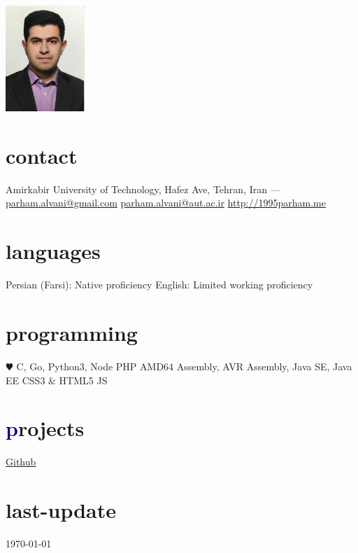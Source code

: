 \documentclass[]{friggeri-cv} %
\begin{document}


\begin{aside} %
	\includegraphics[width=3cm, height=4cm]{../parham_alvani_pers.jpg}
	\section{\textcolor{TextYellow}{c}ontact}
	Amirkabir University of Technology,
	Hafez Ave,
	Tehran, Iran
	---
	\href{mailto:parham.alvani@gmail.com}{parham.alvani@gmail.com}
	\href{mailto:parham.alvani@aut.ac.ir}{parham.alvani@aut.ac.ir}
	\href{http://1995parham.me/}{http://1995parham.me}
	\section{\textcolor{TextOrange}{l}anguages}
	Persian (Farsi):
	Native proficiency
	English:
	Limited working proficiency
	\section{\textcolor{TextGreen}{p}rogramming}
	{\color{red} $\varheartsuit$} C, Go, Python3, Node
	PHP
	AMD64 Assembly,
	AVR Assembly,
	Java SE, Java EE
	CSS3 \& HTML5
	JS
	\section{\textcolor{DarkBlue}{p}rojects}
	\href{https://github.com/1995parham}{\textcolor{TextGreen}{Github}}
	\section{\textcolor{Ocean}{last}-update}
	\today
\end{aside}
\end{document}
